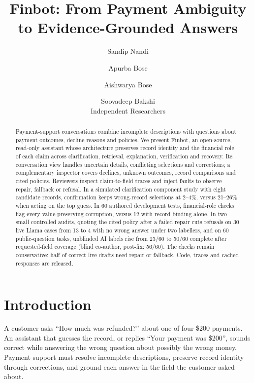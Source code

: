 \documentclass[11pt]{article}
\title{Finbot: From Payment Ambiguity\\to Evidence-Grounded Answers}
\author{Sandip Nandi \and Apurba Bose \and Aishwarya Bose \and Soovadeep Bakshi \\
  Independent Researchers}
\begin{document}
\maketitle

\begin{abstract}
Payment-support conversations combine incomplete descriptions with questions about payment
outcomes, decline reasons and policies. We present Finbot, an open-source, read-only assistant
whose architecture preserves record identity and the financial role of each claim across
clarification, retrieval, explanation, verification and recovery. Its conversation view handles
uncertain details, conflicting selections and corrections; a complementary inspector covers
declines, unknown outcomes, record comparisons and cited policies. Reviewers inspect
claim-to-field traces and inject faults to observe repair, fallback or refusal. In a simulated
clarification component study with eight candidate records, confirmation keeps wrong-record
selections at 2--4\%, versus 21--26\% when acting on the top guess. In 60 authored development
tests, financial-role checks flag every value-preserving corruption, versus 12 with record
binding alone. In two small controlled audits, quoting the cited policy after a failed repair
cuts refusals on 30 live Llama cases from 13 to 4 with no wrong answer under two labellers, and
on 60 public-question tasks, unblinded AI labels rise from 23/60 to 50/60 complete after
requested-field coverage (blind co-author, post-fix: 56/60). The
checks remain conservative: half of correct live drafts need repair or fallback. Code, traces and
cached responses are released.
\end{abstract}

\section{Introduction}

A customer asks ``How much was refunded?'' about one of four \$200 payments. An assistant that
guesses the record, or replies ``Your payment was \$200'', sounds correct while answering the
wrong question about possibly the wrong money. Payment support must resolve incomplete
descriptions, preserve record identity through corrections, and ground each answer in the field
the customer asked about.
\end{document}
